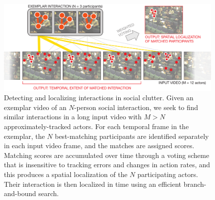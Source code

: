 \begin{figure}[t]
\begin{center}
\includegraphics[width=\columnwidth]{voting.pdf}
\end{center}
\caption{Detecting and localizing interactions in social clutter. Given an exemplar video of an $N$-person social interaction, we seek to find similar interactions in a long input video with $M>N$ approximately-tracked actors. For each temporal frame in the exemplar, the $N$ best-matching participants are identified separately in each input video frame, and the matches are assigned scores. Matching scores are accumulated over time through a voting scheme that is insensitive to tracking errors and changes in action rates, and this produces a spatial localization of the $N$ participating actors. Their interaction is then localized in time using an efficient branch-and-bound search.}
\label{diagram}
\end{figure}

